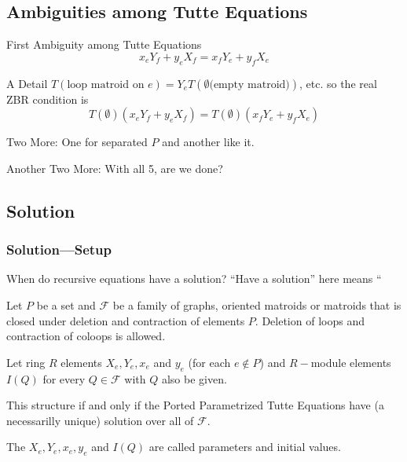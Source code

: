 \documentclass{beamer}
\begin{document}
\subsection{Ambiguities among Tutte Equations}

\begin{frame}
{First Ambiguity among Tutte Equations}
\[
x_eY_f+y_eX_f=x_fY_e+y_fX_e
\]
\begin{center}\end{center}

\begin{block}{A Detail}
$T(\text{loop matroid on }e) = Y_eT(\emptyset\text{(empty matroid)})$, etc.
so the real ZBR condition is 
\[
T(\emptyset)(x_eY_f+y_eX_f)=T(\emptyset)(x_fY_e+y_fX_e)
\]
\end{block}


\end{frame}

\begin{frame}{Two More: One for separated $P$ and another like it.}

\end{frame}

\begin{frame}{Another Two More: With all 5, are we done?}

\end{frame}

\subsection{Solution}
\begin{frame}
\frametitle{Solution---Setup}
\begin{block}{When do recursive equations have a solution?}
``Have a solution'' here means ``
\end{block}

\begin{definition}
Let $P$ be a set and $\mathcal{F}$ be a family of graphs, oriented
matroids or matroids that is closed under deletion and 
contraction of elements
 $P$.  Deletion of loops and contraction of coloops is 
allowed.

Let ring $R$ elements $X_e, Y_e, x_e$ and $y_e$ (for each $e\not\in P$)
and $R-$module elements $I(Q)$ for every $Q\in \mathcal{F}$ 
with $Q$  also be given.

This structure  if and only if
the Ported Parametrized Tutte Equations have (a necessarilly
unique) solution over all of $\mathcal{F}$.
\end{definition}

The $X_e, Y_e, x_e, y_e$ and $I(Q)$ are called parameters and
initial values.
\end{frame}
\end{document}
